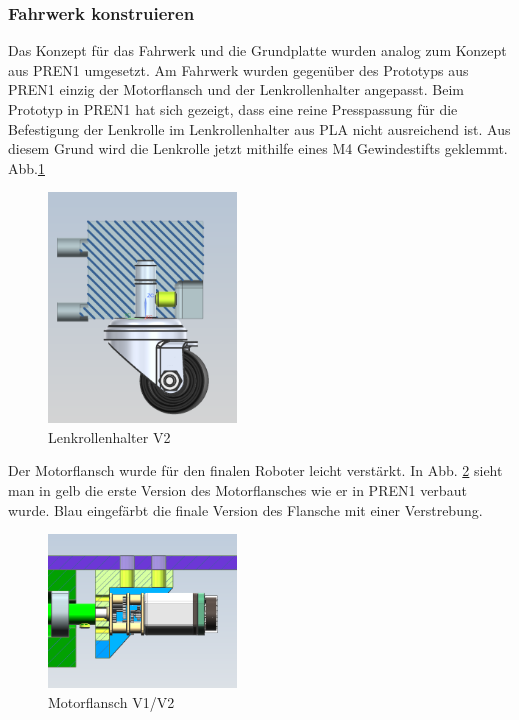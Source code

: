 \subsubsection{Fahrwerk konstruieren}

 Das Konzept für das Fahrwerk und die Grundplatte wurden analog zum Konzept aus PREN1 umgesetzt. Am Fahrwerk wurden gegenüber des Prototyps aus PREN1 einzig der Motorflansch und der Lenkrollenhalter angepasst. Beim Prototyp in PREN1 hat sich gezeigt, dass eine reine Presspassung für die Befestigung der Lenkrolle im Lenkrollenhalter aus PLA nicht ausreichend ist. Aus diesem Grund wird die Lenkrolle jetzt mithilfe eines M4 Gewindestifts geklemmt. Abb.\ref{fig: Lenkrollenhalter V2} 

\begin{figure}[H]
\centering
\includegraphics[width=5cm]{assets/MT/Lenkrollenhalter V2.png}
\caption{Lenkrollenhalter V2}
\label{fig: Lenkrollenhalter V2}
\end{figure}

Der Motorflansch wurde für den finalen Roboter leicht verstärkt. In  Abb. \ref{fig: Motorflansch V1/V2} sieht man in gelb die erste Version des Motorflansches wie er in PREN1 verbaut wurde. Blau eingefärbt die finale Version des Flansche mit einer Verstrebung. 

\begin{figure}[H]
\centering
\includegraphics[width=5cm]{assets/MT/Motorflansch Vergleich.png}
\caption{Motorflansch V1/V2}
\label{fig: Motorflansch V1/V2}
\end{figure}

